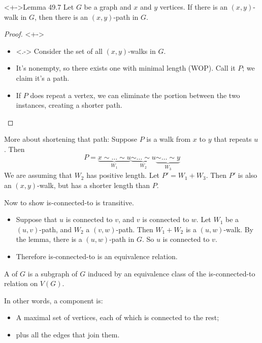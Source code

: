 \documentclass
[ignorenonframetext,aspectratio=169]
{ngelessonslides}
\begin{document}
\begin{frame}[label=lemma]
\begin{block}<+->{Lemma 49.7}
Let $G$ be a graph and $x$ and $y$ vertices.
If there is an $(x,y)$-walk in $G$, then there is an $(x,y)$-path in $G$.
\end{block}
\begin{proof}<+->
\begin{itemize}
\item<.-> Consider the set of all $(x,y)$-walks in $G$.
\item<+-> It's nonempty, so there exists one with minimal length (WOP).  Call it $P$; we claim it's a path.
\item<+-> If $P$ does repeat a vertex, we can eliminate the portion between the two instances, creating a shorter path. \raa \qedhere
\end{itemize}
\end{proof}
\end{frame}

\begin{frame}[label=lemma-2]
More about shortening that path:  Suppose $P$ is a walk from $x$ to $y$ that repeats $u$.  Then
\[
    P = \underbrace{x \sim \dots \sim u}_{W_1}%
    \underbrace{\sim \dots \sim u}_{W_2}%
    \underbrace{\sim \dots \sim y}_{W_3}
\]
We are assuming that $W_2$ has positive length.
Let $P' = W_1 + W_3$.  Then $P'$ is also an $(x,y)$-walk, but has a shorter length than $P$.
\end{frame}

\begin{frame}[label=ctd-thm-proof-2]
Now to show is-connected-to is transitive.
\begin{itemize}
\item Suppose that $u$ is connected to $v$, and $v$ is connected to $w$.
    Let $W_1$ be a $(u,v)$-path, and $W_2$ a $(v,w)$-path.
    Then $W_1+W_2$ is a $(u,w)$-walk.
    By the lemma, there is a $(u,w)$-path in $G$.
    So $u$ is connected to $v$.
\item Therefore is-connected-to is an equivalence relation.
\end{itemize}
\end{frame}

\begin{frame}[label=cpt-def]
\begin{definition}
    A  of $G$ is a subgraph of $G$ induced by an equivalence class of
    the is-connected-to relation on $V(G)$.
\end{definition}
In other words, a component is:
\begin{itemize}
\item A maximal set of vertices, each of which is connected to the rest;
\item plus all the edges that join them.
\end{itemize}
\end{frame}
\end{document}
